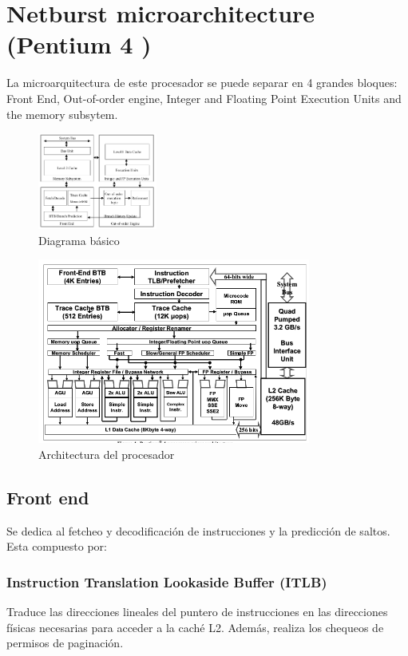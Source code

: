 \section{Netburst microarchitecture (Pentium 4 \cite{Sager01themicroarchitecture})}
La microarquitectura de este procesador se puede separar en 4 grandes bloques: Front End, Out-of-order engine, Integer and Floating Point Execution Units and the memory subsytem.

\begin{figure}[ht]
	\centering
	\includegraphics[width=0.35\textwidth]{imagenes/p4-block-architecture}
	\caption{Diagrama básico}
	\label{fig:p4DiagramaBasico}
\end{figure}
\begin{figure}[ht]
	\centering
	\includegraphics[width=0.8\textwidth]{imagenes/p4-architecture}
	\caption{Architectura del procesador}
	\label{fig:p4DiagramaCompleto}
\end{figure}

\subsection{Front end}
Se dedica al fetcheo y decodificación de instrucciones y la predicción de saltos. Esta compuesto por:
\subsubsection*{Instruction Translation Lookaside Buffer (ITLB)}
Traduce las direcciones lineales del puntero de instrucciones en las direcciones físicas necesarias para acceder a la caché L2. Además, realiza los chequeos de permisos de paginación.

